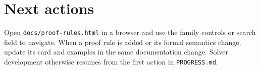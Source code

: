 \documentclass[11pt]{article}
\begin{document}
\section{Next actions}
Open \texttt{docs/proof-rules.html} in a browser and use the family controls or
search field to navigate. When a proof rule is added or its formal semantics
change, update its card and examples in the same documentation change. Solver
development otherwise resumes from the first action in \texttt{PROGRESS.md}.
\end{document}
